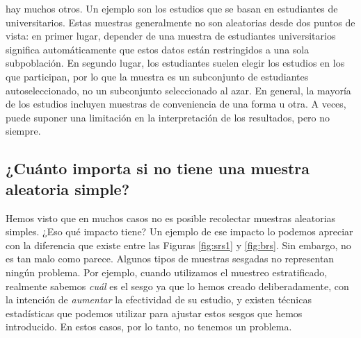 \documentclass[spanish,]{book}
\begin{document}
\begin{itemize}
  hay muchos otros. Un ejemplo son los estudios que se basan en
  estudiantes de universitarios. Estas muestras generalmente no son
  aleatorias desde dos puntos de vista: en primer lugar, depender de una
  muestra de estudiantes universitarios significa automáticamente que
  estos datos están restringidos a una sola subpoblación. En segundo
  lugar, los estudiantes suelen elegir los estudios en los que
  participan, por lo que la muestra es un subconjunto de estudiantes
  autoseleccionado, no un subconjunto seleccionado al azar. En general,
  la mayoría de los estudios incluyen muestras de conveniencia de una
  forma u otra. A veces, puede suponer una limitación en la
  interpretación de los resultados, pero no siempre.
\end{itemize}

\subsection{¿Cuánto importa si no tiene una muestra aleatoria
simple?}\label{cuanto-importa-si-no-tiene-una-muestra-aleatoria-simple}

Hemos visto que en muchos casos no es posible recolectar muestras
aleatorias simples. ¿Eso qué impacto tiene? Un ejemplo de ese impacto lo
podemos apreciar con la diferencia que existe entre las Figuras
\ref{fig:srs1} y \ref{fig:brs}. Sin embargo, no es tan malo como parece.
Algunos tipos de muestras sesgadas no representan ningún problema. Por
ejemplo, cuando utilizamos el muestreo estratificado, realmente sabemos
\emph{cuál} es el sesgo ya que lo hemos creado deliberadamente, con la
intención de \emph{aumentar} la efectividad de su estudio, y existen
técnicas estadísticas que podemos utilizar para ajustar estos sesgos que
hemos introducido. En estos casos, por lo tanto, no tenemos un problema.
\end{document}
